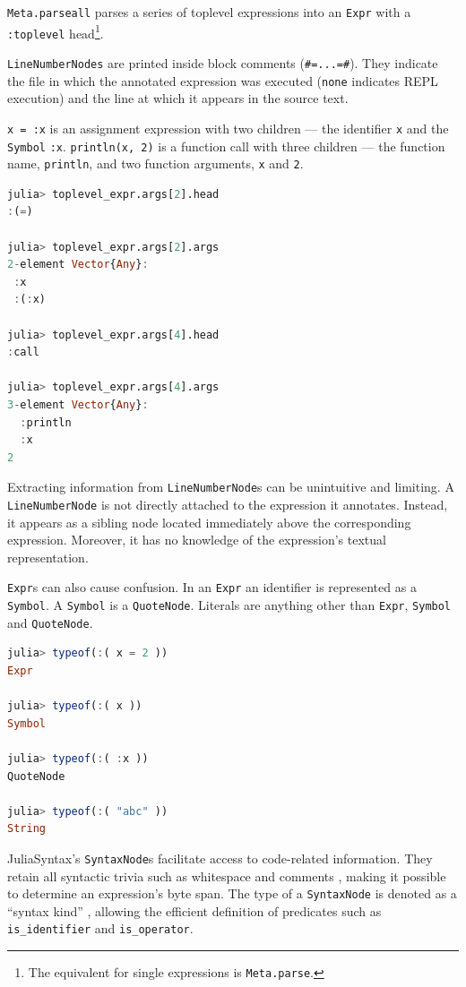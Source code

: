 \documentclass{juliacon}
\begin{document}
\texttt{Meta.parseall} parses a series of toplevel expressions into an \texttt{Expr}
with a \texttt{:toplevel} head\footnote{The equivalent for single expressions is \texttt{Meta.parse}.}.

\texttt{LineNumberNodes} are printed inside block comments (\texttt{\#=...=\#}). They
indicate the file in which the annotated expression was executed
(\texttt{none} indicates REPL execution) and the line at which it appears in
the source text.

\texttt{x = :x} is an assignment expression with two children — the
identifier \texttt{x} and the \texttt{Symbol} \texttt{:x}. \texttt{println(x, 2)} is a function
call with three children — the function name, \texttt{println}, and two
function arguments, \texttt{x} and \texttt{2}.

\begin{lstlisting}[language=Julia]
julia> toplevel_expr.args[2].head
:(=)

julia> toplevel_expr.args[2].args
2-element Vector{Any}:
 :x
 :(:x)

julia> toplevel_expr.args[4].head
:call

julia> toplevel_expr.args[4].args
3-element Vector{Any}:
  :println
  :x
2
\end{lstlisting}

Extracting information from \texttt{LineNumberNode}s can be unintuitive and
limiting. A \texttt{LineNumberNode} is not directly attached to the
expression it annotates. Instead, it appears as a sibling node located
immediately above the corresponding expression. Moreover, it has no
knowledge of the expression's textual representation.

\texttt{Expr}s can also cause confusion. In an \texttt{Expr} an identifier is
represented as a \texttt{Symbol}. A \texttt{Symbol} is a \texttt{QuoteNode}. Literals are
anything other than \texttt{Expr}, \texttt{Symbol} and \texttt{QuoteNode}.

\begin{lstlisting}[language=Julia]
julia> typeof(:( x = 2 ))
Expr

julia> typeof(:( x ))
Symbol

julia> typeof(:( :x ))
QuoteNode

julia> typeof(:( "abc" ))
String
\end{lstlisting}

JuliaSyntax's \texttt{SyntaxNode}s facilitate access to code-related
information. They retain all syntactic trivia such as whitespace and
comments \cite{juliasyntax}, making it possible to determine an
expression's byte span. The type of a \texttt{SyntaxNode} is denoted as a
``syntax kind'' \cite{js_kinds}, allowing the efficient definition of
predicates such as \texttt{is\_identifier} and \texttt{is\_operator}.
\end{document}
